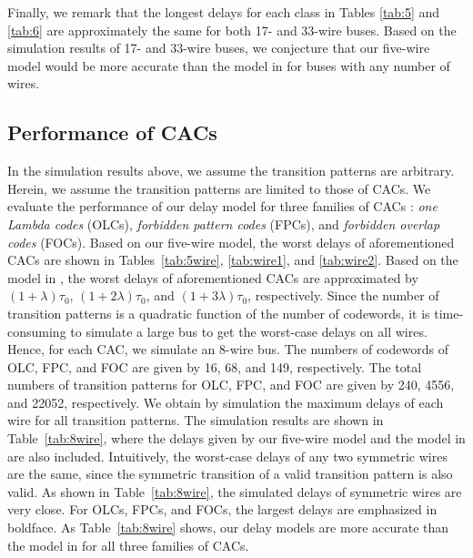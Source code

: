 \documentclass[10pt,journal]{IEEEtran}
\begin{document}
Finally, we remark that the longest delays for each class in Tables \ref{tab:5} and \ref{tab:6} are approximately the same for both 17- and 33-wire buses.
Based on the simulation results of 17- and 33-wire buses, we conjecture that our five-wire model would be more accurate than the model in \cite{Sot01} for buses with any number of wires.





\subsection{Performance of CACs}\label{sec:simCACs}
In the simulation results above, we assume the transition patterns are arbitrary. Herein, we assume the transition patterns are limited to those of CACs. We evaluate the performance of our delay model for three families of CACs \cite{Dua01,Vic01,Sri07}: {\it one Lambda codes} (OLCs), {\it forbidden pattern codes} (FPCs), and {\it forbidden overlap codes} (FOCs).
Based on our five-wire model, the worst delays of aforementioned CACs are shown in Tables~\ref{tab:5wire}, \ref{tab:wire1}, and \ref{tab:wire2}.
Based on the model in \cite{Sot01}, the worst delays of aforementioned CACs are approximated by $(1+\lambda)\tau_0$, $(1+2\lambda)\tau_0$, and $(1+3\lambda)\tau_0$, respectively.
Since the number of transition patterns is a quadratic function of the number of codewords, it is time-consuming to simulate a large bus to get the worst-case delays on all wires.
Hence, for each CAC, we simulate an 8-wire bus. The numbers of codewords of OLC, FPC, and FOC are given by 16, 68, and 149, respectively. The total numbers of transition patterns for OLC, FPC, and FOC are given by 240, 4556, and 22052, respectively.
We obtain by simulation the maximum delays of each wire for all transition patterns. The simulation results are shown in Table~\ref{tab:8wire}, where the delays given by our five-wire model and the model in \cite{Sot01} are also included. Intuitively, the worst-case delays of any two symmetric wires are the same, since the symmetric transition of a valid transition pattern is also valid.
As shown in Table~\ref{tab:8wire}, the simulated delays of symmetric wires are very close.
For OLCs, FPCs, and FOCs, the largest delays are emphasized in boldface. As Table~\ref{tab:8wire} shows,
our delay models are more accurate than the model in \cite{Sot01} for all three families of CACs.
\end{document}

